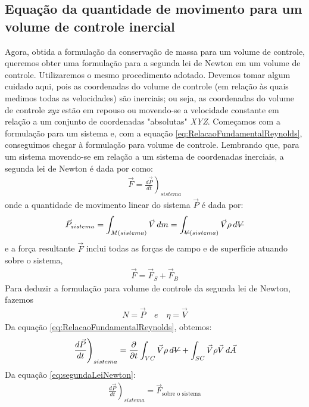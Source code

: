 \documentclass{article}
\newcommand{\stkout}[1]{\ifmmode\text{\sout{\ensuremath{#1}}}\else\sout{#1}\fi}
\begin{document}
\subsection{Equação da quantidade de movimento para um volume de controle inercial}
Agora, obtida a formulação da conservação de massa para um volume de controle, queremos obter uma formulação para a segunda lei de Newton em um volume de controle. Utilizaremos o mesmo procedimento adotado. Devemos tomar algum cuidado aqui, pois as coordenadas do volume de controle (em relação às quais medimos todas as velocidades) são inerciais; ou seja, as coordenadas do volume de controle \textit{xyz} estão em repouso ou movendo-se a velocidade constante em relação a um conjunto de coordenadas "absolutas" \textit{XYZ}. Começamos com a formulação para um sistema e, com a equação \ref{eq:RelacaoFundamentalReynolds}, conseguimos chegar à formulação para volume de controle.
Lembrando que, para um sistema movendo-se em relação a um sistema de coordenadas inerciais, a segunda lei de Newton é dada por como:
\begin{align*}
  \vec{F}=\left.\frac{d\vec{P}}{dt}\right)_{sistema}
\end{align*}
onde a quantidade de movimento linear do sistema $\vec{P}$ é dada por:
\begin{align*}
  \vec{P}_{sistema}=\int_{M(sistema)}^{ } \vec{V}\, dm = \int_{\stkout{V}(sistema)}^{ } \vec{V} \rho\, d\stkout{V}
\end{align*}
e a força resultante $\vec{F}$ inclui todas as forças de campo e de superfície atuando sobre o sistema,
\begin{align*}
  \vec{F}=\vec{F}_S + \vec{F}_B
\end{align*}
Para deduzir a formulação para volume de controle da segunda lei de Newton, fazemos
\begin{align*}
  N=\vec{P} \quad e \quad \eta = \vec{V}
\end{align*}
Da equação \ref{eq:RelacaoFundamentalReynolds}, obtemos:
\begin{equation}
  \left.\frac{d\vec{P}}{dt}\right)_{sistema}=\frac{\partial}{\partial t}\int_{VC}^{ } \vec{V} \rho \, d\stkout{V} + \int_{SC}^{ } \vec{V} \rho \vec{V}\, d\vec{A}
  \label{eq:quantidadeMovimentoVolumeDeControle}
\end{equation}
Da equação \ref{eq:segundaLeiNewton}:
\begin{align}
  \left.\frac{d\vec{P}}{dt}\right)_{sistema}=\vec{F}_{\text{sobre o sistema}}
  \label{eq:VariacaoQuantMovimentoLinearIgualForcaSobreSistema}
\end{align}
\end{document}
